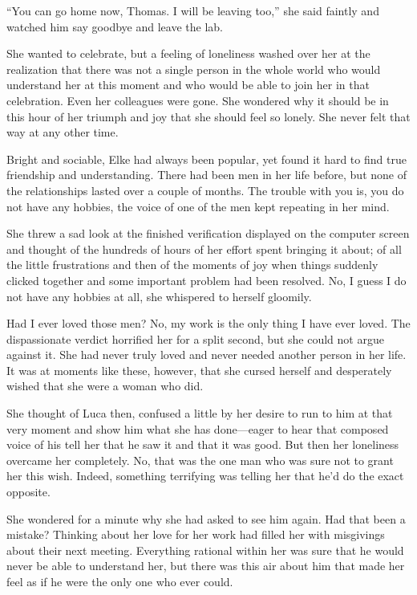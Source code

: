 ``You can go home now, Thomas. I will be leaving too,'' she said faintly and watched him say goodbye and leave the lab.

She wanted to celebrate, but a feeling of loneliness washed over her at the realization that there was not a single person in the whole world who would understand her at this moment and who would be able to join her in that celebration. Even her colleagues were gone. She wondered why it should be in this hour of her triumph and joy that she should feel so lonely. She never felt that way at any other time.

Bright and sociable, Elke had always been popular, yet found it hard to find true friendship and understanding. There had been men in her life before, but none of the relationships lasted over a couple of months. The trouble with you is, you do not have any hobbies, the voice of one of the men kept repeating in her mind.

She threw a sad look at the finished verification displayed on the computer screen and thought of the hundreds of hours of her effort spent bringing it about; of all the little frustrations and then of the moments of joy when things suddenly clicked together and some important problem had been resolved. No, I guess I do not have any hobbies at all, she whispered to herself gloomily.

Had I ever loved those men? No, my work is the only thing I have ever loved. The dispassionate verdict horrified her for a split second, but she could not argue against it. She had never truly loved and never needed another person in her life. It was at moments like these, however, that she cursed herself and desperately wished that she were a woman who did.

She thought of Luca then, confused a little by her desire to run to him at that very moment and show him what she has done---eager to hear that composed voice of his tell her that he saw it and that it was good. But then her loneliness overcame her completely. No, that was the one man who was sure not to grant her this wish. Indeed, something terrifying was telling her that he'd do the exact opposite.

She wondered for a minute why she had asked to see him again. Had that been a mistake? Thinking about her love for her work had filled her with misgivings about their next meeting. Everything rational within her was sure that he would never be able to understand her, but there was this air about him that made her feel as if he were the only one who ever could.

